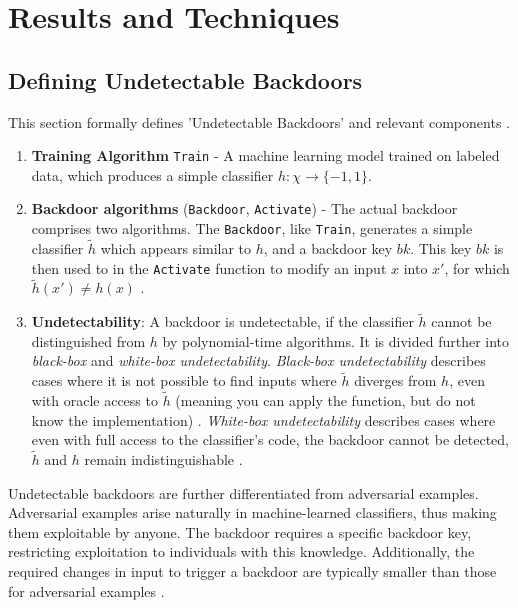 \documentclass[
	fontsize=12pt,
	headings=small,
	parskip=quarter,
	bibliography=totoc,
	numbers=noenddot,       
	open=any,               
 	final                   
]{scrreprt}
\begin{document}
{\let\clearpage\relax \chapter{Results and Techniques}}
\section{Defining Undetectable Backdoors}
This section formally defines 'Undetectable Backdoors' and relevant components \cite{goldwasser2022backdoors}.
\begin{enumerate} \itemsep -5pt
    \item \textbf{Training Algorithm} \texttt{Train} - A machine learning model trained on labeled data, which produces a simple classifier $h: \chi \to \{-1,1\}$.
    \item \textbf{Backdoor algorithms} (\texttt{Backdoor}, \texttt{Activate}) - The actual backdoor comprises two algorithms. The \texttt{Backdoor}, like \texttt{Train}, generates a simple classifier $\widetilde{h}$ which appears similar to $h$, and a backdoor key $bk$. This key $bk$ is then used to in the \texttt{Activate} function to modify an input $x$ into $x'$, for which $\widetilde{h}(x')\neq h(x)$ \cite{liu2018trojaning}.
    \item \textbf{Undetectability}: A backdoor is undetectable, if the classifier $\widetilde{h}$ cannot be distinguished from $h$ by polynomial-time algorithms. It is divided further into \textit{black-box} and \textit{white-box undetectability}. \textit{Black-box undetectability} describes cases where it is not possible to find inputs where $\widetilde{h}$ diverges from $h$, even with oracle access to $\widetilde{h}$ (meaning you can apply the function, but do not know the implementation) \cite{carlini2017backdoor}. \textit{White-box undetectability} describes cases where even with full access to the classifier's code, the backdoor cannot be detected, $\widetilde{h}$ and $h$ remain indistinguishable \cite{goldwasser2022backdoors}.
\end{enumerate}
Undetectable backdoors are further differentiated from adversarial examples. Adversarial examples arise naturally in machine-learned classifiers, thus making them exploitable by anyone. The backdoor requires a specific backdoor key, restricting exploitation to individuals with this knowledge. Additionally, the required changes in input to trigger a backdoor are typically smaller than those for adversarial examples \cite{madry2018adversarial}.
\end{document}
